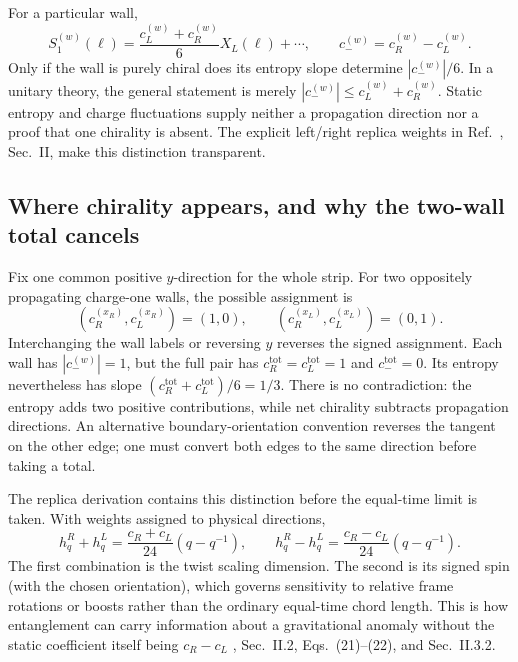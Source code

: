\documentclass[aps,prb,onecolumn,nofootinbib,superscriptaddress]{revtex4-2}
\begin{document}
For a particular wall,
\begin{equation}
 S_1^{(w)}(\ell)=
 \frac{c_L^{(w)}+c_R^{(w)}}{6}X_L(\ell)+\cdots,\qquad
 c_-^{(w)}=c_R^{(w)}-c_L^{(w)} .
 \label{eq:chiral-difference}
\end{equation}
Only if the wall is purely chiral does its entropy slope determine
$|c_-^{(w)}|/6$. In a unitary theory, the general statement is merely
$|c_-^{(w)}|\leq c_L^{(w)}+c_R^{(w)}$.
Static entropy and charge fluctuations supply neither a propagation
direction nor a proof that one chirality is absent. The explicit
left/right replica weights in Ref.~\cite{CastroDetournayIqbalPerlmutter2014},
Sec.~II, make this distinction transparent.

\subsection{Where chirality appears, and why the two-wall total cancels}
Fix one common positive $y$-direction for the whole strip. For two
oppositely propagating charge-one walls, the possible assignment is
\begin{equation}
 (c_R^{(x_R)},c_L^{(x_R)})=(1,0),\qquad
 (c_R^{(x_L)},c_L^{(x_L)})=(0,1).
 \label{eq:opposite-wall-charges}
\end{equation}
Interchanging the wall labels or reversing $y$ reverses the signed
assignment. Each wall has $|c_-^{(w)}|=1$, but the full pair has
$c_R^{\mathrm{tot}}=c_L^{\mathrm{tot}}=1$ and
$c_-^{\mathrm{tot}}=0$. Its entropy nevertheless has slope
$(c_R^{\mathrm{tot}}+c_L^{\mathrm{tot}})/6=1/3$.
There is no contradiction: the entropy adds two positive contributions,
while net chirality subtracts propagation directions. An alternative
boundary-orientation convention reverses the tangent on the other edge;
one must convert both edges to the same direction before taking a total.

The replica derivation contains this distinction before the equal-time
limit is taken. With weights assigned to physical directions,
\begin{equation}
 h_q^R+h_q^L=\frac{c_R+c_L}{24}(q-q^{-1}),\qquad
 h_q^R-h_q^L=\frac{c_R-c_L}{24}(q-q^{-1}).
 \label{eq:twist-dimension-spin}
\end{equation}
The first combination is the twist scaling dimension. The second is
its signed spin (with the chosen orientation), which governs sensitivity
to relative frame rotations or boosts rather than the ordinary
equal-time chord length. This is how entanglement can carry information
about a gravitational anomaly without the static coefficient itself
being $c_R-c_L$ \cite{CastroDetournayIqbalPerlmutter2014},
Sec.~II.2, Eqs.~(21)--(22), and Sec.~II.3.2.
\end{document}
